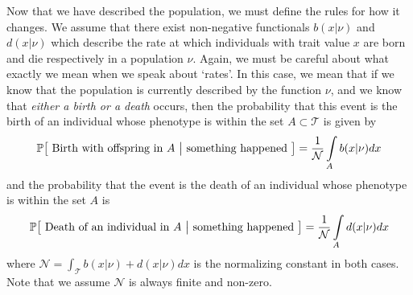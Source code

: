 Now that we have described the population, we must define the rules for how it changes. We assume that there exist non-negative functionals $b(x|\nu)$ and $d(x|\nu)$ which describe the rate at which individuals with trait value $x$ are born and die respectively in a population $\nu$. Again, we must be careful about what exactly we mean when we speak about `rates'. In this case, we mean that if we know that the population is currently described by the function $\nu$, and we know that \emph{either a birth or a death} occurs, then the probability that this event is the birth of an individual whose phenotype is within the set $A \subset \mathcal{T}$ is given by
\begin{equation*}
    \mathbb{P}\big[\textrm{ Birth with offspring in $A$ } \big{|} \textrm{ something happened }\big] = \frac{1}{\mathcal{N}}\int\limits_{A}b(x|\nu)dx
\end{equation*}
and the probability that the event is the death of an individual whose phenotype is within the set $A$ is
\begin{equation*}
    \mathbb{P}\big[\textrm{ Death of an individual in $A$ } \big{|} \textrm{ something happened }\big] = \frac{1}{\mathcal{N}}\int\limits_{A}d(x|\nu)dx
\end{equation*}
where $\mathcal{N} = \int_{\mathcal{T}}b(x|\nu)+d(x|\nu)dx$ is the normalizing constant in both cases. Note that we assume $\mathcal{N}$ is always finite and non-zero.

